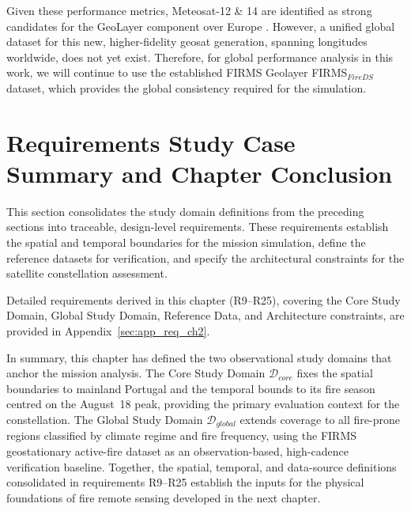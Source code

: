 Given these performance metrics, Meteosat-12 \& 14 are identified as strong candidates for the GeoLayer component over Europe . However, a unified global dataset for this new, higher-fidelity geosat generation, spanning longitudes worldwide, does not yet exist. Therefore, for global performance analysis in this work, we will continue to use the established FIRMS Geolayer FIRMS$_{FireDS}$ dataset, which provides the global consistency required for the simulation.



\section{Requirements Study Case Summary and Chapter Conclusion}
\label{sec:requirements-study-case-summary}

This section consolidates the study domain definitions from the preceding sections into traceable, design-level requirements. These requirements establish the spatial and temporal boundaries for the mission simulation, define the reference datasets for verification, and specify the architectural constraints for the satellite constellation assessment.

Detailed requirements derived in this chapter (R9--R25), covering the Core Study Domain, Global Study Domain, Reference Data, and Architecture constraints, are provided in Appendix~\ref{sec:app_req_ch2}.

In summary, this chapter has defined the two observational study domains that anchor the mission analysis. The Core Study Domain $\mathcal{D}_{core}$ fixes the spatial boundaries to mainland Portugal and the temporal bounds to its fire season centred on the August~18 peak, providing the primary evaluation context for the constellation. The Global Study Domain $\mathcal{D}_{global}$ extends coverage to all fire-prone regions classified by climate regime and fire frequency, using the FIRMS geostationary active-fire dataset as an observation-based, high-cadence verification baseline. Together, the spatial, temporal, and data-source definitions consolidated in requirements R9--R25 establish the inputs for the physical foundations of fire remote sensing developed in the next chapter.

